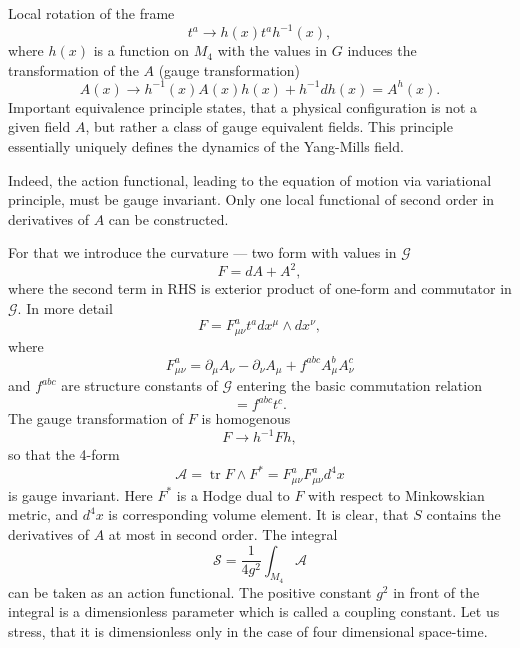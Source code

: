 \documentclass[12pt]{article}
\DeclareMathOperator{\tr}{tr}
\newcommand{\MM}{M}
\newcommand{\GG}{G}
\newcommand{\pr} {\partial}
\newcommand{\AAA}{\mathcal{S}}
\newcommand{\ff}{\mathcal{A}}
\newcommand{\JJ} {\mathcal{G}}
\begin{document}
	Local rotation of the frame
\begin{equation*}
        t^{a} \to h(x) t^{a} h^{-1}(x) ,
\end{equation*}
	where
    $ h(x) $
	is a function on
    $ \MM_{4} $
	with the values in
    $ \GG $
	induces the transformation of the
    $ A $
	(gauge transformation)
\begin{equation*}
        A(x) \to h^{-1}(x) A(x) h(x) + h^{-1} dh(x) = A^{h}(x) .
\end{equation*}
	Important equivalence principle states, that a physical
	configuration is not a given field
    $ A $,
	but rather a class of gauge equivalent fields. This principle
	essentially uniquely defines the dynamics of the
	Yang-Mills field.

	Indeed, the action functional, leading to the equation of motion via
	variational principle, must be gauge invariant. Only one local
	functional of second order in derivatives of
    $ A $
	can be constructed.

	For that we introduce the curvature --- two form with values in
    $ \JJ $
\begin{equation*}
	F = d A + A^{2} ,
\end{equation*}
	where the second term in RHS is exterior product of one-form
	and commutator in
    $ \JJ $.
	In more detail
\begin{equation*}
        F = F^{a}_{\mu\nu} t^{a} dx^{\mu} \wedge dx^{\nu} ,
\end{equation*}
	where
\begin{equation*}
        F^{a}_{\mu\nu} = \pr_{\mu} A_{\nu} - \pr_{\nu} A_{\mu} +
		f^{abc} A^{b}_{\mu} A^{c}_{\nu}
\end{equation*}
	and
    $ f^{abc} $
	are structure constants of
    $ \JJ $
	entering the basic commutation relation
\begin{equation*}
        [ t^{a} , t^{b} ] = f^{abc} t^{c} .
\end{equation*}
	The gauge transformation of
    $ F $
	is homogenous
\begin{equation*}
        F \to h^{-1} F h ,
\end{equation*}
	so that the 4-form
\begin{equation*}
        \ff = \tr F \wedge F^{*} = F^{a}_{\mu\nu} F^{a}_{\mu\nu} d^{4}x
\end{equation*}
	is gauge invariant. Here
    $ F^{*} $
	is a Hodge dual to
    $ F $
	with respect to Minkowskian metric, and
    $ d^{4}x $
	is corresponding volume element. It is clear, that
    $ S $
	contains the derivatives of
    $ A $
	at most in second order. The integral
\begin{equation}
\label{AC}
        \AAA = \frac{1}{4 g^{2}} \int_{\MM_{4}} \ff
\end{equation}
	can be taken as an action functional. The positive constant
    $ g^{2} $
	in front of the integral is a dimensionless parameter which
	is called a coupling constant. Let us stress, that it is
	dimensionless only in the case of four dimensional space-time.
\end{document}
